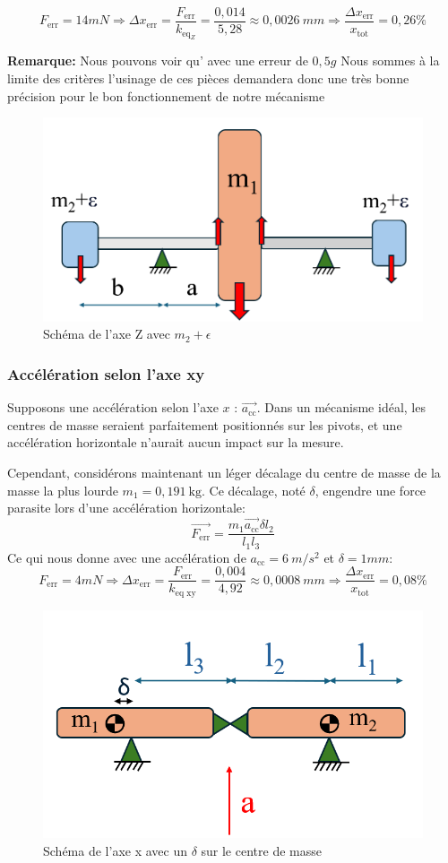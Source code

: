 \documentclass[a4paper, 11pt]{article} %
\begin{document}
$$F_\text{err} = 14mN\Rightarrow \Delta x_\text{err} = \frac{{F_\text{err}}}{k_{\text{eq}_Z}} = \frac{0,014}{5,28} \approx 0,0026 \ mm \Rightarrow \frac{\Delta x_\text{err}}{x_\text{tot}} = 0,26\% $$

\textbf{Remarque:} Nous pouvons voir qu' avec une erreur de $0,5g$ Nous sommes à la limite des critères l'usinage de ces pièces demandera donc une très bonne précision pour le bon fonctionnement de notre mécanisme 



\begin{figure}[H]
    \centering
    \includegraphics[width=0.6\linewidth]{images/erreur_masse.png}
    \caption{Schéma de l'axe Z avec $m_2 + \epsilon $}
    \label{fig:erreur_z}
\end{figure}
\subsubsection*{Accélération selon l'axe xy}

Supposons une accélération selon l'axe $x$ : $\vec{a_\text{cc}}$. Dans un mécanisme idéal, les centres de masse seraient parfaitement positionnés sur les pivots, et une accélération horizontale n'aurait aucun impact sur la mesure.

Cependant, considérons maintenant un léger décalage du centre de masse de la masse la plus lourde $m_1 = 0{,}191~\text{kg}$. Ce décalage, noté $\delta $, engendre une force parasite lors d'une accélération horizontale:
$$\vec{F_\text{err}} = \frac{m_1\vec{a_\text{cc}} \delta l_2}{l_1l_3}$$
Ce qui nous donne avec une accélération de $a_\text{cc} = 6 \ m/s^2$ et $ \delta = 1 mm$:
$$F_\text{err} = 4mN\Rightarrow\Delta x_\text{err} = \frac{{F_\text{err}}}{k_{\text{eq xy}}} = \frac{0,004}{4,92} \approx 0,0008 \ mm \Rightarrow \frac{\Delta x_\text{err}}{x_\text{tot}} = 0,08\%$$

\begin{figure}[H]
    \centering
    \includegraphics[width=0.6\linewidth]{images/erreur_acceleration_x.png}
    \caption{Schéma de l'axe x avec un $\delta $ sur le centre de masse}
    \label{fig:erreur_z}
\end{figure}
\end{document}
